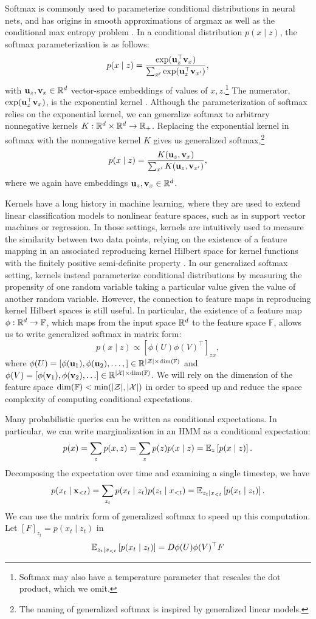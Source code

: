 \documentclass{article}
\begin{document}
Softmax is commonly used to parameterize conditional distributions in
neural nets, and has origins in smooth
approximations of argmax as well as the conditional max entropy problem \citep{}.
In a conditional distribution $p(x \mid z)$, the softmax parameterization is as follows: 
$$p(x \mid z) = \frac{\exp(\mathbf{u}_z^\top \mathbf{v}_x)}{\sum_{x'} \exp(\mathbf{u}_z^\top \mathbf{v}_{x'})},$$
with $\mathbf{u}_z,\mathbf{v}_x\in\mathbb{R}^d$ vector-space embeddings of values of $x,z$.\footnote{
Softmax may also have a temperature parameter that rescales 
the dot product, which we omit.
}
The numerator, $\exp(\mathbf{u}_z^\top \mathbf{v}_x)$, is the exponential kernel \citep{rawat2019sampledsoftmax}.
Although the parameterization of softmax relies on the exponential kernel,
we can generalize softmax to arbitrary nonnegative kernels $K: \mathbb{R}^d\times\mathbb{R}^d\to\mathbb{R}_+$.
Replacing the exponential kernel in softmax with the nonnegative kernel $K$
gives us generalized softmax,\footnote{
The naming of generalized softmax is inspired by generalized linear models.
}
$$p(x \mid z) = \frac{K(\mathbf{u}_z, \mathbf{v}_x)}{\sum_{x'} K(\mathbf{u}_z, \mathbf{v}_{x'})},$$
where we again have embeddings $\mathbf{u}_z,\mathbf{v}_x\in\mathbb{R}^d$.

Kernels have a long history in machine learning,
where they are used to extend linear classification models to nonlinear feature spaces,
such as in support vector machines or regression.
In those settings, kernels are intuitively used to measure the similarity between two data points,
relying on the existence of a feature mapping in an associated reproducing kernel Hilbert space 
for kernel functions with the finitely positive semi-definite property \citep{}.
In our generalized softmax setting, kernels instead parameterize conditional distributions by
measuring the propensity of one random variable taking a particular value given
the value of another random variable.
However, the connection to feature maps in reproducing kernel Hilbert spaces 
is still useful.
In particular, the existence of a feature map $\phi:\mathbb{R}^d\to\mathbb{F}$,
which maps from the input space $\mathbb{R}^d$ to the feature space $\mathbb{F}$,
allows us to write generalized softmax in matrix form:
$$p(x \mid z) \propto [\phi(U)\phi(V)^\top]_{zx},$$
where $\phi(U) = [\phi(\mathbf{u}_1), \phi(\mathbf{u}_2), \ldots,] \in\mathbb{R}^{|\mathcal{Z}|\times \dim(\mathbb{F})}$
and $\phi(V) = [\phi(\mathbf{v}_1), \phi(\mathbf{v}_2), \ldots]\in\mathbb{R}^{|\mathcal{X}|\times \dim(\mathbb{F})}$.
We will rely on the dimension of the feature space $\dim(\mathbb{F}) < \min(|\mathcal{Z}|,|\mathcal{X}|)$
in order to speed up and reduce the space complexity of computing conditional expectations.

Many probabilistic queries can be written as conditional expectations.
In particular, we can write marginalization in an HMM as a conditional expectation:
$$p(x) = \sum_z p(x,z) = \sum_z p(z)p(x \mid z) = \mathbb{E}_{z}\left[p(x \mid z)\right].$$
Decomposing the expectation over time and examining a single timestep, we have
$$p(x_t \mid \mathbf{x}_{<t}) = \sum_{z_t} p(x_t \mid z_t)p(z_t \mid x_{<t})
= \mathbb{E}_{z_t\mid x_{<t}}\left[p(x_t \mid z_t)\right].$$
We can use the matrix form of generalized softmax to speed up this computation.
Let $[F]_{z_t} = p(x_t\mid z_t)$ in
$$\mathbb{E}_{z_t \mid x_{<t}}\left[p(x_t \mid z_t)\right] = D\phi(U)\phi(V)^\top F$$
\end{document}
